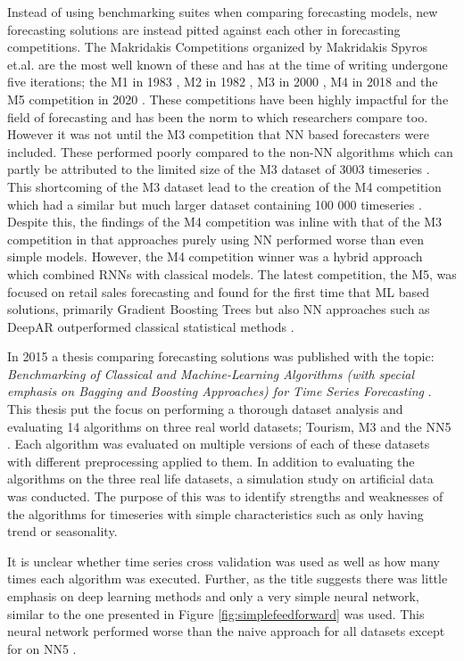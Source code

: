 Instead of using benchmarking suites when comparing forecasting models, new forecasting solutions are instead pitted against each other in forecasting competitions. The Makridakis Competitions organized by Makridakis Spyros et.al. are the most well known of these and has at the time of writing undergone five iterations; the M1 in 1983 \cite{makridakis1987confidence}, M2 in 1982 \cite{makridakis1993m2}, M3 in 2000 \cite{m3_competition}, M4 in 2018 \cite{makridakis_m4_2020} and the M5 competition in 2020 \cite{m5}. These competitions have been highly impactful for the field of forecasting and has been the norm to which researchers compare too. However it was not until the M3 competition that NN based forecasters were included. These performed poorly compared to the non-NN algorithms which can partly be attributed to the limited size of the M3 dataset of 3003 timeseries \cite{m3_competition}. This shortcoming of the M3 dataset lead to the creation of the M4 competition which had a similar but much larger dataset containing 100 000 timeseries \cite{makridakis_m4_2020}. Despite this, the findings of the M4 competition was inline with that of the M3 competition in that approaches purely using NN performed worse than even simple models. However, the M4 competition winner was a hybrid approach which combined RNNs with classical models. The latest competition, the M5, was focused on retail sales forecasting and found for the first time that ML based solutions, primarily Gradient Boosting Trees but also NN approaches such as DeepAR outperformed classical statistical methods \cite{m5}.

In 2015 a thesis comparing forecasting solutions was published with the topic: \textit{Benchmarking of Classical and Machine-Learning Algorithms (with special emphasis on Bagging and Boosting Approaches) for Time Series Forecasting} \cite{other_thesis}. This thesis put the focus on performing a thorough dataset analysis and evaluating 14 algorithms on three real world datasets; Tourism, M3 and the NN5 \cite{NN5_website}. Each algorithm was evaluated on multiple versions of each of these datasets with different preprocessing applied to them. In addition to evaluating the algorithms on the three real life datasets, a simulation study on artificial data was conducted. The purpose of this was to identify strengths and weaknesses of the algorithms for timeseries with simple characteristics such as only having trend or seasonality.

It is unclear whether time series cross validation was used as well as how many times each algorithm was executed. Further, as the title suggests there was little emphasis on deep learning methods and only a very simple neural network, similar to the one presented in Figure \ref{fig:simplefeedforward} was used. This neural network performed worse than the naive approach for all datasets except for on NN5 \cite{other_thesis}.



